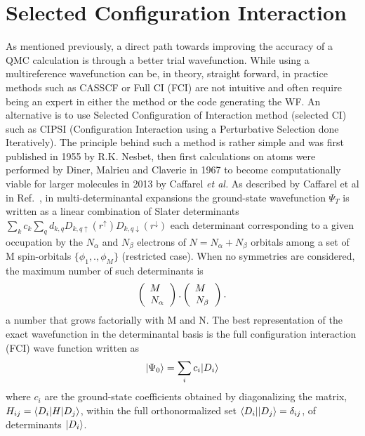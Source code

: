 \chapter{Selected Configuration Interaction}
\label{chap:sCI}
 As mentioned previously, a direct path towards improving the accuracy of a QMC calculation is through a better trial wavefunction. While using a multireference wavefunction can be, in theory, straight forward, in practice methods such as CASSCF or Full CI (FCI) are not intuitive and often require being an expert in either the method or the code generating the WF. An alternative is to use Selected Configuration of Interaction method (selected CI) such as CIPSI (Configuration Interaction using a Perturbative Selection done Iteratively). The principle behind such a method is rather simple and was first published in 1955 by R.K. Nesbet\cite{Nesbet1955}, then first calculations on atoms were performed by Diner, Malrieu and Claverie\cite{Diner1967} in 1967 to become computationally viable for larger molecules in 2013 by Caffarel \textit{et al.}\cite{Caffarel2013}  
% 
% 
 As described by Caffarel et al in Ref.~\cite{Caffarel2013}, in multi-determinantal expansions the ground-state wavefunction $\Psi_T$ is written as a linear combination of Slater determinants
 $\sum_k c_k \sum_q d_{k,q}D_{k,q\uparrow } (r^{\uparrow})D_{k,q\downarrow}(r^{\downarrow})$ %
  each determinant corresponding to a given occupation by the $N_{\alpha}$ and $N_{\beta}$ electrons of $N=N_{\alpha}+N_{\beta}$ orbitals among a set of M spin-orbitals $\{\phi_1,.,\phi_M\}$ (restricted case). When no symmetries are
considered, the maximum number of such determinants is
\begin{eqnarray}
\label{eqn:Det-Permutations}
\left(
\begin{array}{c} M \hspace{1.5mm} \\ N_{\alpha}  \end{array}
\right).
\left(
\begin{array}{c} M \hspace{1.5mm} \\ N_{\beta}  \end{array}
\right).
\end{eqnarray}
a number that grows factorially with M and N. The best representation of the exact wavefunction in the determinantal basis is the full configuration interaction (FCI) wave function written as 
\begin{equation}
\ket{\Psi_0}=\sum_{i} c_{i} \ket{D_i}
\end{equation}
where $c_i$ are the ground-state coefficients obtained by diagonalizing the matrix, $H_{ij}=\bra{D_i}H\ket{D_j}$, 
within the full orthonormalized set $\bra{D_i}\ket{D_j}=\delta_{ij}$,
 of determinants $\ket{D_i}$.\\ 

